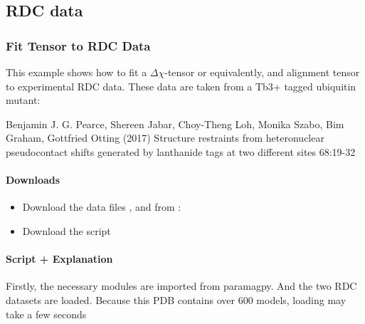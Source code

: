 \documentclass[a4paper,10pt,english]{sphinxmanual}
\begin{document}
\subsection{RDC data}
\label{\detokenize{examples/index:rdc-data}}

\subsubsection{Fit Tensor to RDC Data}
\label{\detokenize{examples/rdc_fit:fit-tensor-to-rdc-data}}\label{\detokenize{examples/rdc_fit:rdc-fit}}\label{\detokenize{examples/rdc_fit::doc}}
This example shows how to fit a \({\Delta\chi}\)-tensor or equivalently, and alignment tensor to experimental RDC data. These data are taken from a Tb3+ tagged ubiquitin mutant:

Benjamin J. G. Pearce, Shereen Jabar, Choy-Theng Loh, Monika Szabo, Bim Graham, Gottfried Otting (2017) Structure restraints from heteronuclear pseudocontact shifts generated by lanthanide tags at two different sites  68:19-32


\paragraph{Downloads}
\label{\detokenize{examples/rdc_fit:downloads}}\begin{itemize}
\item {} 
Download the data files ,  and  from :

\item {} 
Download the script 

\end{itemize}


\paragraph{Script + Explanation}
\label{\detokenize{examples/rdc_fit:script-explanation}}
Firstly, the necessary modules are imported from paramagpy. And the two RDC datasets are loaded. Because this PDB contains over 600 models, loading may take a few seconds
\end{document}
